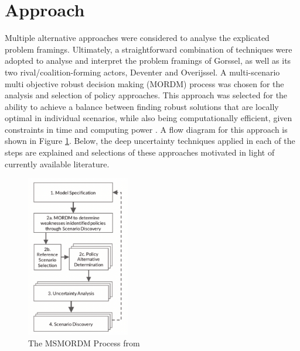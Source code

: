 \section{Approach}
\label{s:approach}


Multiple alternative approaches were considered to analyse the explicated problem framings. Ultimately, a straightforward combination of techniques were adopted to analyse and interpret the problem framings of Gorssel, as well as its two rival/coalition-forming actors, Deventer and Overijssel. A multi-scenario multi objective robust decision making (MORDM) process was chosen for the analysis and selection of policy approaches. This approach was selected for the ability to achieve a balance between finding robust solutions that are locally optimal in individual scenarios, while also being computationally efficient, given constraints in time and computing power \parencite{bartholomew_considering_2020}. A flow diagram for this approach is shown in Figure \ref{fig:msmordm}. Below, the deep uncertainty techniques applied in each of the steps are explained and selections of these approaches motivated in light of currently available literature. 

\begin{figure}[h]
    \centering
    \includegraphics[width=0.4\textwidth]{report/figures/msmordm.png}
    \caption{The MSMORDM Process from \citeauthor{bartholomew_considering_2020}}
    \label{fig:msmordm}
\end{figure}

